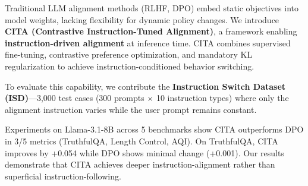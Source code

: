 
Traditional LLM alignment methods (RLHF, DPO) embed static objectives into model weights, lacking flexibility for dynamic policy changes. We introduce \textbf{CITA (Contrastive Instruction-Tuned Alignment)}, a framework enabling \textbf{instruction-driven alignment} at inference time. CITA combines supervised fine-tuning, contrastive preference optimization, and mandatory KL regularization to achieve instruction-conditioned behavior switching.

To evaluate this capability, we contribute the \textbf{Instruction Switch Dataset (ISD)}---3,000 test cases (300 prompts $\times$ 10 instruction types) where only the alignment instruction varies while the user prompt remains constant.

Experiments on Llama-3.1-8B across 5 benchmarks show CITA outperforms DPO in 3/5 metrics (TruthfulQA, Length Control, AQI). On TruthfulQA, CITA improves by +0.054 while DPO shows minimal change (+0.001). Our results demonstrate that CITA achieves deeper instruction-alignment rather than superficial instruction-following.
